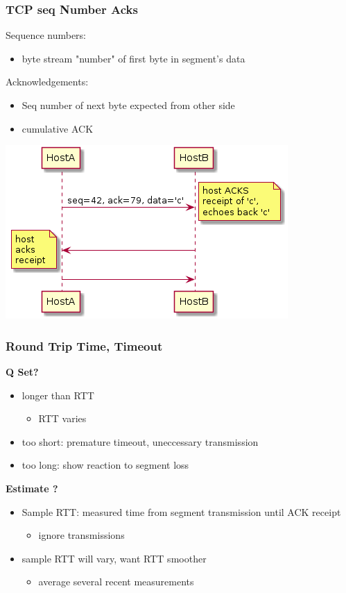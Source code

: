 \documentclass[11pt]{article}
\begin{document}
\subsubsection{TCP seq Number Acks}
\label{sec:org7795edc}
Sequence numbers:
\begin{itemize}
\item byte stream "number" of first byte in segment's data
\end{itemize}

Acknowledgements:
\begin{itemize}
\item Seq number of next byte expected from other side
\item cumulative ACK
\end{itemize}

\begin{center}
\includegraphics[width=.9\linewidth]{telnetEG.png}
\end{center}



\subsubsection{Round Trip Time, Timeout}
\label{sec:org91cd637}
\textbf{Q Set?}
\begin{itemize}
\item longer than RTT
\begin{itemize}
\item RTT varies
\end{itemize}
\item too short: premature timeout, uneccessary transmission
\item too long: show reaction to segment loss
\end{itemize}

\textbf{Estimate ?}
\begin{itemize}
\item Sample RTT: measured time from segment transmission until ACK
receipt 
\begin{itemize}
\item ignore transmissions
\end{itemize}
\item sample RTT will vary, want RTT smoother
\begin{itemize}
\item average several recent measurements
\end{itemize}
\end{itemize}
\end{document}
